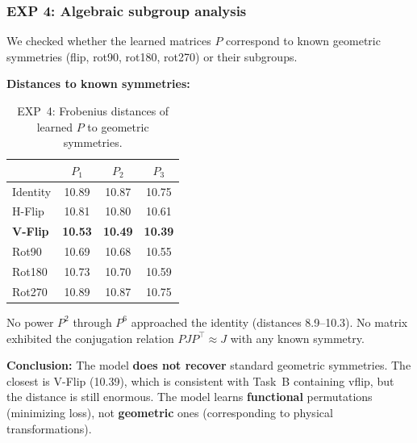 \subsubsection*{EXP 4: Algebraic subgroup analysis}

We checked whether the learned matrices $P$ correspond to known geometric symmetries (flip, rot90, rot180, rot270) or their subgroups.

\textbf{Distances to known symmetries:}
\begin{table}[h]
\centering
\caption{EXP~4: Frobenius distances of learned $P$ to geometric symmetries.}
\begin{tabular}{lccc}
\hline
 & $P_1$ & $P_2$ & $P_3$ \\
\hline
Identity & 10.89 & 10.87 & 10.75 \\
H-Flip   & 10.81 & 10.80 & 10.61 \\
\textbf{V-Flip} & \textbf{10.53} & \textbf{10.49} & \textbf{10.39} \\
Rot90    & 10.69 & 10.68 & 10.55 \\
Rot180   & 10.73 & 10.70 & 10.59 \\
Rot270   & 10.89 & 10.87 & 10.75 \\
\hline
\end{tabular}
\end{table}

No power $P^2$ through $P^6$ approached the identity (distances 8.9--10.3). No matrix exhibited the conjugation relation $PJP^\top \approx J$ with any known symmetry.

\textbf{Conclusion:} The model \textbf{does not recover} standard geometric symmetries. The closest is V-Flip (10.39), which is consistent with Task~B containing vflip, but the distance is still enormous. The model learns \textbf{functional} permutations (minimizing loss), not \textbf{geometric} ones (corresponding to physical transformations).
